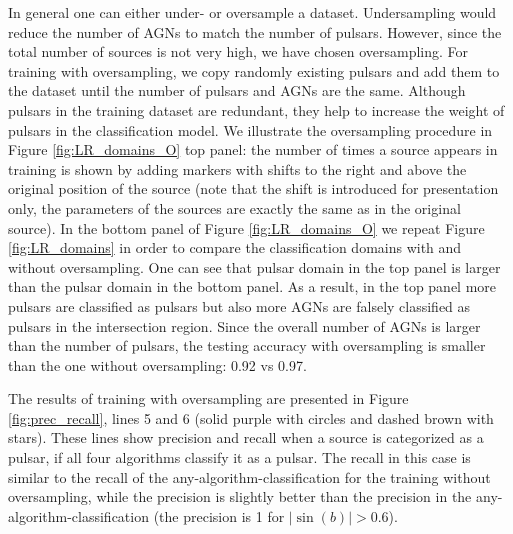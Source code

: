 In general one can either under- or oversample a dataset. Undersampling would reduce the number of AGNs to match the number of pulsars. However, since the total number of sources is not very high, we have chosen oversampling. 
For training with oversampling, we copy randomly existing pulsars and add them to the dataset until the number of pulsars and AGNs are the same.
Although pulsars in the training dataset are redundant, they help to increase the weight of pulsars in the classification model.
We illustrate the oversampling procedure in Figure \ref{fig:LR_domains_O} top panel:
the number of times a source appears in training is shown by adding markers with shifts to the right and above the original position of the source (note that the shift is introduced for presentation only, the parameters of the sources are exactly the same as in the original source).
In the bottom panel of Figure \ref{fig:LR_domains_O} we repeat Figure  \ref{fig:LR_domains} in order to compare the classification domains with and without oversampling.
One can see that pulsar domain in the top panel is larger than the pulsar domain in the bottom panel.
As a result, in the top panel more pulsars are classified as pulsars but also more AGNs are falsely classified as pulsars in the intersection region. 
Since the overall number of AGNs is larger than the number of pulsars, the testing accuracy with oversampling is smaller than the one without oversampling: 0.92 vs 0.97.

The results of training with oversampling are presented  in Figure \ref{fig:prec_recall},
lines 5 and 6 (solid purple with circles and dashed brown with stars). These lines show precision and recall when a source is categorized as a pulsar, if all four algorithms classify it as a pulsar. The recall in this case is similar to the recall of the any-algorithm-classification for the training without oversampling,
while the precision is slightly better than the precision in the any-algorithm-classification (the precision is 1 for $|\sin(b)| > 0.6$).


